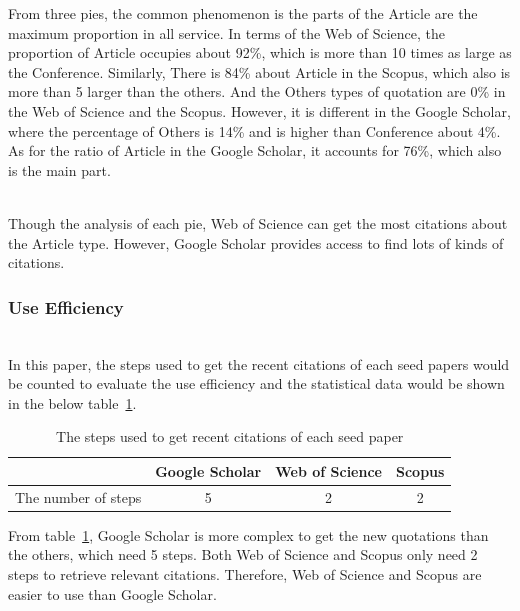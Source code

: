 \documentclass[runningheads]{llncs}
\begin{document}
From three pies, the common phenomenon is the parts of the Article are the maximum proportion in all service. In terms of the Web of Science, the proportion of Article occupies about 92\%, which is more than 10 times as large as the Conference. Similarly, There is 84\% about Article in the Scopus, which also is more than 5 larger than the others. And the Others types of quotation are 0\% in the Web of Science and the Scopus. However, it is different in the Google Scholar, where the percentage of Others is 14\% and is higher than Conference about 4\%. As for the ratio of Article in the Google Scholar, it accounts for 76\%, which also is the main part.
\par\noindent\\
Though the analysis of each pie, Web of Science can get the most citations about the Article type. However, Google Scholar provides access to find lots of kinds of citations.
\\


\subsubsection{Use Efficiency}
\par\noindent\\
In this paper, the steps used to get the recent citations of each seed papers would be counted to evaluate the use efficiency and the statistical data would be shown in the below table~\ref{tab:my_label3}.

\begin{table}
    \setlength{\abovecaptionskip}{10pt}%
    \setlength{\belowcaptionskip}{0pt}%
    \captionsetup{labelsep= period}
    \caption{The steps used to get recent citations of each seed paper }
    \centering
    \begin{tabular}{|c|c|c|c|}
    \hline
         &Google Scholar& Web of Science& Scopus  \\
    \hline
         The number of steps & 5 & 2 & 2 \\
    \hline
    \end{tabular}
    \label{tab:my_label3}
\end{table}
\par
\noindent
From table~\ref{tab:my_label3}, Google Scholar is more complex to get the new quotations than the others, which need 5 steps. Both Web of Science and Scopus only need 2 steps to retrieve relevant citations. Therefore, Web of Science and  Scopus are easier to use than Google Scholar.
\end{document}
